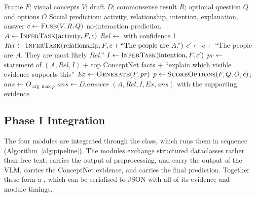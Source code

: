 \begin{algorithm}[H]
\caption{Social Interaction Reasoning}
\label{alg:reason}
\begin{algorithmic}[1]
\Require Frame $F$; visual concepts $V$; draft $D$; commonsense result $R$; optional question $Q$ and options $O$
\Ensure Social prediction: activity, relationship, intention, explanation, answer
\State $c \gets \textsc{Fuse}(V, R, Q)$ 
  \State \Return no-interaction prediction
\EndIf
\State $A \gets \textsc{InferTask}(\text{activity}, F, c)$ 
  \State $\mathit{Rel} \gets$  with confidence 1
\Else
  \State $\mathit{Rel} \gets \textsc{InferTask}(\text{relationship}, F, c + \text{``The people are } A\text{.''})$
\EndIf
\State $c' \gets c$ + ``The people are $A$. They are most likely $\mathit{Rel}$.''
\State $I \gets \textsc{InferTask}(\text{intention}, F, c')$
\State $\mathit{pr} \gets$ statement of $(A, \mathit{Rel}, I)$ + top ConceptNet facts + ``explain which visible evidence supports this''
\State $\mathit{Ex} \gets \textsc{Generate}(F, \mathit{pr})$
  \State $p \gets \textsc{ScoreOptions}(F, Q, O, c)$;\; $\mathit{ans} \gets O_{\arg\max p}$
  \State $\mathit{ans} \gets D.\mathit{answer}$
\EndIf
\State \Return $(A, \mathit{Rel}, I, \mathit{Ex}, \mathit{ans})$ with the supporting evidence
\end{algorithmic}
\end{algorithm}

\subsection{Phase I Integration}

The four modules are integrated through the  class, which runs them in sequence (Algorithm~\ref{alg:pipeline}). The modules exchange structured dataclasses rather than free text:  carries the output of preprocessing,  and  carry the output of the VLM,  carries the ConceptNet evidence, and  carries the final prediction. Together these form a , which can be serialised to JSON with all of its evidence and module timings.

